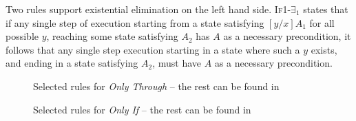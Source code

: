 Two rules support existential elimination on the left hand side. %
\textsc{If1-$\exists_1$} states that if any single step of execution starting
from a state satisfying $[y/x]A_1$ for all possible $y$, reaching some state satisfying
$A_2$ has $A$ as a necessary precondition, it follows that any single step execution
starting in a state where such a $y$ exists, and ending in a state satisfying $A_2$,
must have $A$ as a necessary precondition.   %



\begin{figure}[t]
\footnotesize
{}
\caption{Selected rules for \emph{Only Through} -- the rest can be found in } %
\label{f:only-through}
\end{figure}
\begin{figure}[t]
\footnotesize
{}
\caption{Selected rules for \emph{Only If} -- the rest can be found in } %
\label{f:only-if}
\end{figure}





